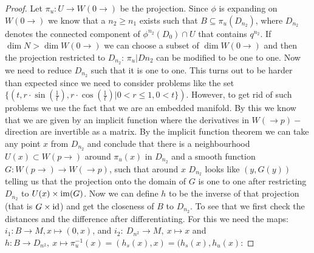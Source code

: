 \begin{proof}
Let $\pi_u:U \to W(0\to)$ be the projection. Since $\phi$ is expanding on $W(0 \to)$ we know that a $n_2\geq n_1$ exists such that $B\subseteq \pi_u(D_{n_2})$, where $D_{n_2}$ denotes the connected component of $\phi^{n_2}(D_0)\cap U$ that contains $q^{n_2}$. If $\dim N > \dim W(0 \to)$ we can choose a subset of $\dim W(0\to)$ and then the projection restricted to $D_{n_2}$:  $\pi_u|{D{n_2}}$ can be modified to be one to one. Now we need to reduce $D_{n_2}$ such that it is one to one. This turns out to be harder than expected since we need to consider problems like the set $\{(t,r\cdot \sin(\frac{1}{t}),r\cdot \cos(\frac{1}{t})|0<r\leq 1, 0<t\})$. 
However, to get rid of such problems we use the fact that we are an embedded manifold. By this we know that we are given by an implicit function where the derivatives in $W(\to p)-$direction are invertible as a matrix. By the implicit function theorem we can take any point $x$ from $D_{n_2}$ and conclude that there is a neighbourhood $U(x)\subset W(p\to)$ around $\pi_u(x)$ in $D_{n_2}$ and a smooth function $G: W(p\to)\to W(\to p)$, such that around $x$ $D_{n_2}$ looks like $(y,G(y))$ telling us that the projection onto the domain of $G$ is one to one after restricting $D_{n_2}$ to $U(x)\times \mathrm{im}(G)$. Now we can define $h$ to be the inverse of that projection (that is $G\times \operatorname{\mathrm{id}}$) and get the closeness of $B$ to $D_{n_2}$. To see that we first check the distances and the difference after differentiating. For this we need the maps: $i_1:B\to M, x \mapsto (0,x)$, and $i_2: ~D_{n^2} \to M,~ x\mapsto x$ and $h: B \to D_{n^2},~ x \mapsto \pi_u^{-1}(x)=(h_s(x),x)=(h_s(x),h_u(x)$:


\end{proof}
